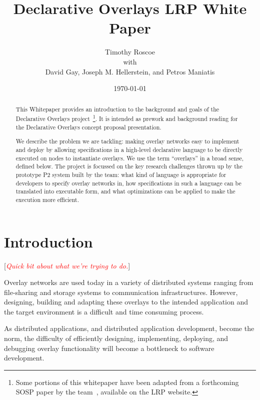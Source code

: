 \documentclass[twocolumn,10pt]{article}
\newcommand{\note}[1]{[\textcolor{red}{\textit{#1}}]}
\def\Lrp{Declarative Overlays\xspace}
\begin{document}
\relax
\title{\Lrp LRP White Paper}
\author{Timothy Roscoe\\
with\\
David Gay, Joseph M. Hellerstein, and Petros Maniatis}
\date{\today}
\maketitle

\begin{abstract}
This Whitepaper provides an introduction to the background and goals
of the \Lrp project~\footnote{Some portions of this whitepaper have
been adapted from a forthcoming SOSP paper by the
team~\cite{p2_sosp05}, available on the LRP website.}.  It is intended
as prework and background reading for the \Lrp concept proposal
presentation.

We describe the problem we are tackling: making overlay networks easy
to implement and deploy by allowing specifications in a high-level
declarative language to be directly executed on nodes to instantiate
overlays.  We use the term ``overlays'' in a broad sense, defined
below.  The project is focussed on the key research challenges thrown
up by the prototype P2 system built by the team: what kind of language
is appropriate for developers to specify overlay networks in, how
specifications in such a language can be translated into executable
form, and what optimizations can be applied to make the execution more
efficient. 

\end{abstract}

\section{Introduction}
\label{sec:vision}

\note{Quick bit about what we're trying to do.}

Overlay networks are used today in a variety of distributed systems
ranging from file-sharing and storage systems to communication
infrastructures.  However, designing, building and adapting these
overlays to the intended application and the target environment is a
difficult and time consuming process.  

As distributed applications, and distributed application development,
become the norm, the difficulty of efficiently
designing, implementing, deploying, and debugging overlay
functionality will become a bottleneck to software development. 
\end{document}
